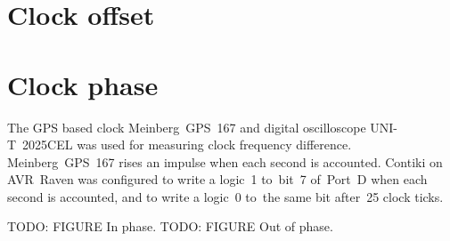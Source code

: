\section{Clock offset}


\section{Clock phase}
The GPS based clock Meinberg~GPS~167 and digital oscilloscope UNI-T~2025CEL
was used for measuring clock frequency difference.
Meinberg~GPS~167 rises an impulse when each second is accounted.
Contiki on AVR~Raven was configured to write a logic~1
to~bit~7 of~Port~D when each second is accounted,
and to write a logic~0 to~the same bit after~25 clock ticks.

TODO: FIGURE
In phase.
TODO: FIGURE
Out of phase.
